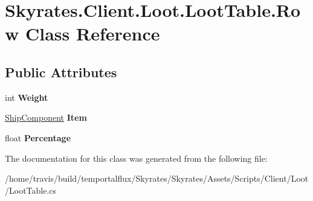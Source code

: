 \hypertarget{class_skyrates_1_1_client_1_1_loot_1_1_loot_table_1_1_row}{\section{Skyrates.\-Client.\-Loot.\-Loot\-Table.\-Row Class Reference}
\label{class_skyrates_1_1_client_1_1_loot_1_1_loot_table_1_1_row}
}
\subsection*{Public Attributes}
\begin{DoxyCompactItemize}
\item 
\hypertarget{class_skyrates_1_1_client_1_1_loot_1_1_loot_table_1_1_row_a37c7e8af6f77228bbc56ea49295d9c5d}{int {\bfseries Weight}}\label{class_skyrates_1_1_client_1_1_loot_1_1_loot_table_1_1_row_a37c7e8af6f77228bbc56ea49295d9c5d}

\item 
\hypertarget{class_skyrates_1_1_client_1_1_loot_1_1_loot_table_1_1_row_a029a405a7e04b52654cff5f0d4537ba8}{\hyperlink{class_skyrates_1_1_client_1_1_ship_1_1_ship_component}{Ship\-Component} {\bfseries Item}}\label{class_skyrates_1_1_client_1_1_loot_1_1_loot_table_1_1_row_a029a405a7e04b52654cff5f0d4537ba8}

\item 
\hypertarget{class_skyrates_1_1_client_1_1_loot_1_1_loot_table_1_1_row_a94033188f91d43c16658659a93df21aa}{float {\bfseries Percentage}}\label{class_skyrates_1_1_client_1_1_loot_1_1_loot_table_1_1_row_a94033188f91d43c16658659a93df21aa}

\end{DoxyCompactItemize}


The documentation for this class was generated from the following file\-:\begin{DoxyCompactItemize}
\item 
/home/travis/build/temportalflux/\-Skyrates/\-Skyrates/\-Assets/\-Scripts/\-Client/\-Loot/Loot\-Table.\-cs\end{DoxyCompactItemize}

